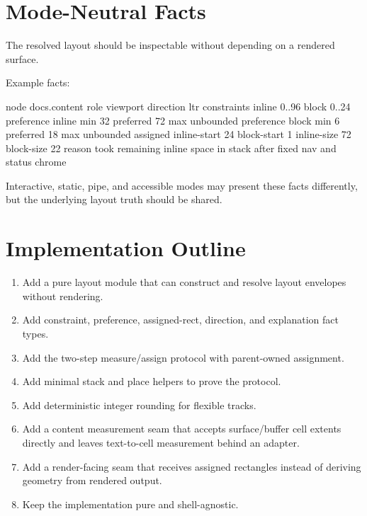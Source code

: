 \section{Mode-Neutral Facts}\label{record-163-mode-neutral-facts}

The resolved layout should be inspectable without depending on a rendered surface.

Example facts:

\begin{CodeBlock}
node docs.content
role viewport
direction ltr
constraints inline 0..96 block 0..24
preference inline min 32 preferred 72 max unbounded
preference block min 6 preferred 18 max unbounded
assigned inline-start 24 block-start 1 inline-size 72 block-size 22
reason took remaining inline space in stack after fixed nav and status chrome
\end{CodeBlock}

Interactive, static, pipe, and accessible modes may present these facts differently, but the underlying layout truth should be shared.

\section{Implementation Outline}\label{record-163-implementation-outline}

\begin{enumerate}
\def\labelenumi{\arabic{enumi}.}
\tightlist
\item
  Add a pure layout module that can construct and resolve layout envelopes without rendering.
\item
  Add constraint, preference, assigned-rect, direction, and explanation fact types.
\item
  Add the two-step measure/assign protocol with parent-owned assignment.
\item
  Add minimal stack and place helpers to prove the protocol.
\item
  Add deterministic integer rounding for flexible tracks.
\item
  Add a content measurement seam that accepts surface/buffer cell extents directly and leaves text-to-cell measurement behind an adapter.
\item
  Add a render-facing seam that receives assigned rectangles instead of deriving geometry from rendered output.
\item
  Keep the implementation pure and shell-agnostic.
\end{enumerate}

